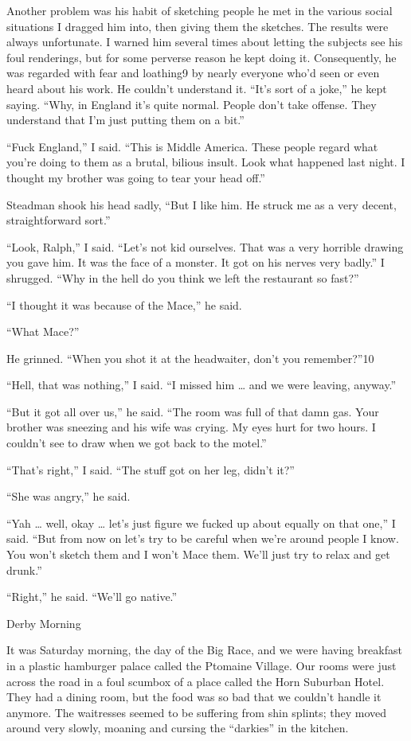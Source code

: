 \documentclass[10pt,a4paper]{article}
\begin{document}
Another problem was his habit of sketching people he met in the various social situations I dragged him into, then giving them the sketches. The results were always unfortunate. I warned him several times about letting the subjects see his foul renderings, but for some perverse reason he kept doing it. Consequently, he was regarded with fear and loathing9 by nearly everyone who’d seen or even heard about his work. He couldn’t understand it. “It’s sort of a joke,” he kept saying. “Why, in England it’s quite normal. People don’t take offense. They understand that I’m just putting them on a bit.”

“Fuck England,” I said. “This is Middle America. These people regard what you’re doing to them as a brutal, bilious insult. Look what happened last night. I thought my brother was going to tear your head off.”

Steadman shook his head sadly, “But I like him. He struck me as a very decent, straightforward sort.”

“Look, Ralph,” I said. “Let’s not kid ourselves. That was a very horrible drawing you gave him. It was the face of a monster. It got on his nerves very badly.” I shrugged. “Why in the hell do you think we left the restaurant so fast?”

“I thought it was because of the Mace,” he said.

“What Mace?”

He grinned. “When you shot it at the headwaiter, don’t you remember?”10

“Hell, that was nothing,” I said. “I missed him … and we were leaving, anyway.”

“But it got all over us,” he said. “The room was full of that damn gas. Your brother was sneezing and his wife was crying. My eyes hurt for two hours. I couldn’t see to draw when we got back to the motel.”

“That’s right,” I said. “The stuff got on her leg, didn’t it?”

“She was angry,” he said.

“Yah … well, okay … let’s just figure we fucked up about equally on that one,” I said. “But from now on let’s try to be careful when we’re around people I know. You won’t sketch them and I won’t Mace them. We’ll just try to relax and get drunk.”

“Right,” he said. “We’ll go native.”

Derby Morning

It was Saturday morning, the day of the Big Race, and we were having breakfast in a plastic hamburger palace called the Ptomaine Village. Our rooms were just across the road in a foul scumbox of a place called the Horn Suburban Hotel. They had a dining room, but the food was so bad that we couldn’t handle it anymore. The waitresses seemed to be suffering from shin splints; they moved around very slowly, moaning and cursing the “darkies” in the kitchen.
\end{document}

